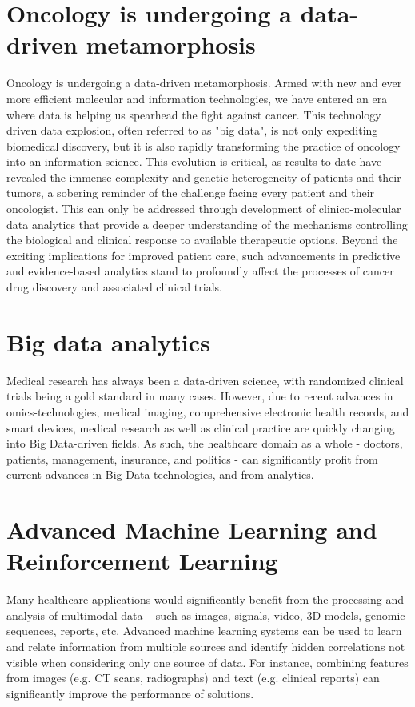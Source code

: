 \documentclass[sigconf]{acmart}
\begin{document}
\section{Oncology is undergoing a data-driven metamorphosis}
Oncology is undergoing a data-driven metamorphosis. Armed with new and ever more efficient molecular and information technologies, we have entered an era where data is helping us spearhead the fight against cancer. This technology driven data explosion, often referred to as "big data", is not only expediting biomedical discovery, but it is also rapidly transforming the practice of oncology into an information science. This evolution is critical, as results to-date have revealed the immense complexity and genetic heterogeneity of patients and their tumors, a sobering reminder of the challenge facing every patient and their oncologist. This can only be addressed through development of clinico-molecular data analytics that provide a deeper understanding of the mechanisms controlling the biological and clinical response to available therapeutic options. Beyond the exciting implications for improved patient care, such advancements in predictive and evidence-based analytics stand to profoundly affect the processes of cancer drug discovery and associated clinical trials.

\section{Big data analytics}
Medical research has always been a data-driven science, with randomized clinical trials being a gold standard in many cases. However, due to recent advances in omics-technologies, medical imaging, comprehensive electronic health records, and smart devices, medical research as well as clinical practice are quickly changing into Big Data-driven fields. As such, the healthcare domain as a whole - doctors, patients, management, insurance, and politics - can significantly profit from current advances in Big Data technologies, and from analytics.

\section{Advanced Machine Learning and Reinforcement Learning}
Many healthcare applications would significantly benefit from the processing and analysis of multimodal data – such as images, signals, video, 3D models, genomic sequences, reports, etc. Advanced machine learning systems can be used to learn and relate information from multiple sources and identify hidden correlations not visible when considering only one source of data. For instance, combining features from images (e.g. CT scans, radiographs) and text (e.g. clinical reports) can significantly improve the performance of solutions. 
\end{document}
